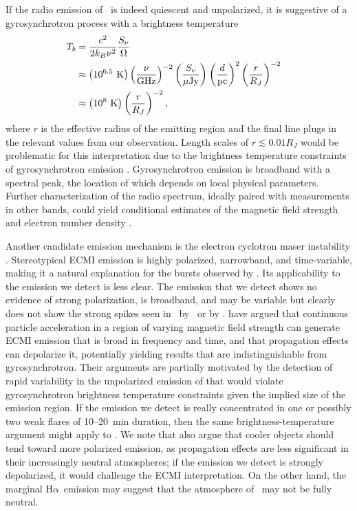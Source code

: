 \documentclass[iop]{emulateapj}
\newcommand\citeeg[1]{\citep[e.g.,][]{#1}}
\newcommand\ujy{\ensuremath{\mu\text{Jy}}}
\newcommand\vtwom{2M\,1047+21} %
\newcommand\twom{\object{\vtwom}}
\newcommand\fpow[3]{\left(\frac{#1}{#2}\right)^{#3}}
\newcommand\ha{H$\alpha$}
\begin{document}
If the radio emission of \twom\ is indeed quiescent and unpolarized, it is
suggestive of a gyrosynchrotron process with a brightness temperature
\begin{align}
T_b &= \frac{c^2}{2 k_B \nu^2} \frac{S_\nu}{\Omega} \cr
 &\approx \left(10^{6.5}\text{ K}\right) \fpow{\nu}{\text{GHz}}{-2}
   \fpow{S_\nu}{\ujy}{} \fpow{d}{\text{pc}}{2} \fpow{r}{R_J}{-2} \cr
 &\approx \left(10^8\text{ K}\right) \fpow{r}{R_J}{-2},
\end{align}
where $r$ is the effective radius of the emitting region and the final line
plugs in the relevant values from our observation. Length scales of $r
\lesssim 0.01 R_J$ would be problematic for this interpretation due to the
brightness temperature constraints of gyrosynchrotron emission \citep{d85}.
Gyrosynchrotron emission is broadband with a spectral peak, the location of
which depends on local physical parameters. Further characterization of the
radio spectrum, ideally paired with measurements in other bands, could yield
conditional estimates of the magnetic field strength and electron number
density \citeeg{b06b}.

Another candidate emission mechanism is the electron cyclotron maser
instability \citep[ECMI;][]{theecm,t06}. Stereotypical ECMI emission is highly
polarized, narrowband, and time-variable, making it a natural explanation for
the bursts observed by \rw. Its applicability to the emission we detect is
less clear. The emission that we detect shows no evidence of strong
polarization, is broadband, and may be variable but clearly does not show the
strong spikes seen in \twom\ by \rw\ or  by
\citet{brpb+09}. \citet{had+06,had+08} have argued that continuous particle
acceleration in a region of varying magnetic field strength can generate ECMI
emission that is broad in frequency and time, and that propagation effects can
depolarize it, potentially yielding results that are indistinguishable from
gyrosynchrotron. Their arguments are partially motivated by the detection of
rapid variability in the unpolarized emission of  that would violate gyrosynchrotron brightness temperature
constraints given the implied size of the emission region. If the emission we
detect is really concentrated in one or possibly two weak flares of 10--20~min
duration, then the same brightness-temperature argument might apply to \twom.
We note that \citet{had+08} also argue that cooler objects should tend toward
more polarized emission, as propagation effects are less significant in their
increasingly neutral atmospheres; if the emission we detect is strongly
depolarized, it would challenge the ECMI interpretation. On the other hand,
the marginal \ha\ emission \citep{bklb03} may suggest that the atmosphere of
\twom\ may not be fully neutral.
\end{document}
